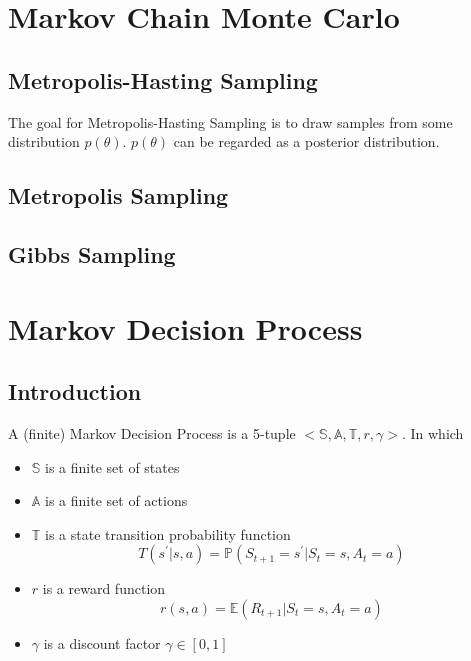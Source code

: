 	\chapter{Markov Chain Monte Carlo}
		\section{Metropolis-Hasting Sampling}
			The goal for Metropolis-Hasting Sampling is to draw samples from some distribution $p(\theta)$. $p(\theta)$ can be regarded as a posterior distribution. 

		\section{Metropolis Sampling}

		\section{Gibbs Sampling}

	\chapter{Markov Decision Process}
		\section{Introduction}
			\begin{definition}
				A (finite) Markov Decision Process is a 5-tuple $<\mathbb{S}, \mathbb{A}, \mathbb{T}, r, \gamma>$. In which
				\begin{itemize}
					\item $\mathbb{S}$ is a finite set of states
					\item $\mathbb{A}$ is a finite set of actions
					\item $\mathbb{T}$ is a state transition probability function
					\begin{equation}
						T(s^\prime|s, a) = \mathbb{P}(S_{t+1} = s^\prime|S_t = s, A_t = a)
					\end{equation}
					\item $r$ is a reward function
					\begin{equation}
						r(s, a) = \mathbb{E}(R_{t+1}|S_t = s, A_t = a)
					\end{equation}
					\item $\gamma$ is a discount factor $\gamma \in [0, 1]$
				\end{itemize}
			\end{definition}

